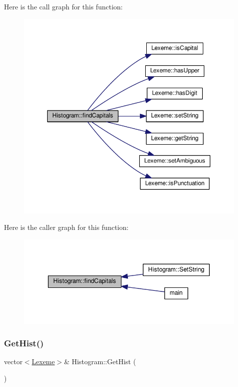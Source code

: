 Here is the call graph for this function\+:
\nopagebreak
\begin{figure}[H]
\begin{center}
\leavevmode
\includegraphics[width=350pt]{class_histogram_a97384bc67a4fcbd79f405329de0a4b41_cgraph}
\end{center}
\end{figure}
Here is the caller graph for this function\+:
\nopagebreak
\begin{figure}[H]
\begin{center}
\leavevmode
\includegraphics[width=343pt]{class_histogram_a97384bc67a4fcbd79f405329de0a4b41_icgraph}
\end{center}
\end{figure}
\mbox{\label{class_histogram_afe807b7c5109c6a9781216961f2a9e90}} 
\subsubsection{\texorpdfstring{Get\+Hist()}{GetHist()}}
{\footnotesize\ttfamily vector$<$\hyperlink{class_lexeme}{Lexeme}$>$\& Histogram\+::\+Get\+Hist (\begin{DoxyParamCaption}{ }\end{DoxyParamCaption})\hspace{0.3cm}{\ttfamily [inline]}}

